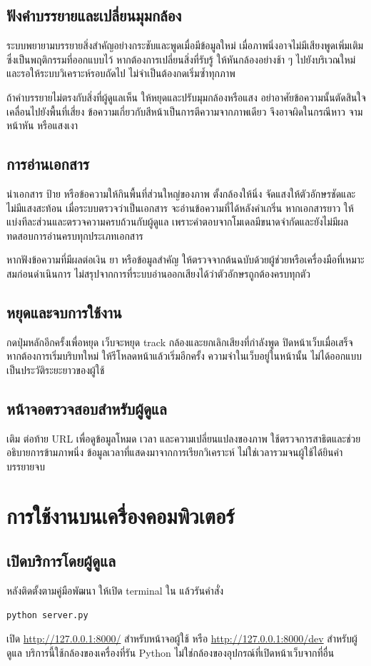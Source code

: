 \section{ฟังคำบรรยายและเปลี่ยนมุมกล้อง}
ระบบพยายามบรรยายสิ่งสำคัญอย่างกระชับและพูดเมื่อมีข้อมูลใหม่ เมื่อภาพนิ่งอาจไม่มีเสียงพูดเพิ่มเติม ซึ่งเป็นพฤติกรรมที่ออกแบบไว้ หากต้องการเปลี่ยนสิ่งที่รับรู้ ให้หันกล้องอย่างช้า ๆ ไปยังบริเวณใหม่และรอให้ระบบวิเคราะห์รอบถัดไป ไม่จำเป็นต้องกดเริ่มซ้ำทุกภาพ

ถ้าคำบรรยายไม่ตรงกับสิ่งที่ผู้ดูแลเห็น ให้หยุดและปรับมุมกล้องหรือแสง อย่าอาศัยข้อความนั้นตัดสินใจเคลื่อนไปยังพื้นที่เสี่ยง ข้อความเกี่ยวกับสีหน้าเป็นการตีความจากภาพเดียว จึงอาจผิดในกรณีหาว จาม หน้าหัน หรือแสงเงา

\section{การอ่านเอกสาร}
นำเอกสาร ป้าย หรือข้อความให้กินพื้นที่ส่วนใหญ่ของภาพ ตั้งกล้องให้นิ่ง จัดแสงให้ตัวอักษรชัดและไม่มีแสงสะท้อน เมื่อระบบตรวจว่าเป็นเอกสาร จะอ่านข้อความที่ได้หลังคำเกริ่น หากเอกสารยาว ให้แบ่งทีละส่วนและตรวจความครบถ้วนกับผู้ดูแล เพราะคำตอบจากโมเดลมีขนาดจำกัดและยังไม่มีผลทดสอบการอ่านครบทุกประเภทเอกสาร

หากฟังข้อความที่มีผลต่อเงิน ยา หรือข้อมูลสำคัญ ให้ตรวจจากต้นฉบับด้วยผู้ช่วยหรือเครื่องมือที่เหมาะสมก่อนดำเนินการ ไม่สรุปจากการที่ระบบอ่านออกเสียงได้ว่าตัวอักษรถูกต้องครบทุกตัว

\section{หยุดและจบการใช้งาน}
กดปุ่มหลักอีกครั้งเพื่อหยุด เว็บจะหยุด track กล้องและยกเลิกเสียงที่กำลังพูด ปิดหน้าเว็บเมื่อเสร็จ หากต้องการเริ่มบริบทใหม่ ให้รีโหลดหน้าแล้วเริ่มอีกครั้ง ความจำในเว็บอยู่ในหน้านั้น ไม่ได้ออกแบบเป็นประวัติระยะยาวของผู้ใช้

\section{หน้าจอตรวจสอบสำหรับผู้ดูแล}
เติม  ต่อท้าย URL เพื่อดูข้อมูลโหมด เวลา และความเปลี่ยนแปลงของภาพ ใช้ตรวจการสาธิตและช่วยอธิบายการข้ามภาพนิ่ง ข้อมูลเวลาที่แสดงมาจากการเรียกวิเคราะห์ ไม่ใช่เวลารวมจนผู้ใช้ได้ยินคำบรรยายจบ

\chapter{การใช้งานบนเครื่องคอมพิวเตอร์}
\section{เปิดบริการโดยผู้ดูแล}
หลังติดตั้งตามคู่มือพัฒนา ให้เปิด terminal ใน  แล้วรันคำสั่ง
\begin{verbatim}
python server.py
\end{verbatim}
เปิด \url{http://127.0.0.1:8000/} สำหรับหน้าจอผู้ใช้ หรือ \url{http://127.0.0.1:8000/dev} สำหรับผู้ดูแล บริการนี้ใช้กล้องของเครื่องที่รัน Python ไม่ใช่กล้องของอุปกรณ์ที่เปิดหน้าเว็บจากที่อื่น

